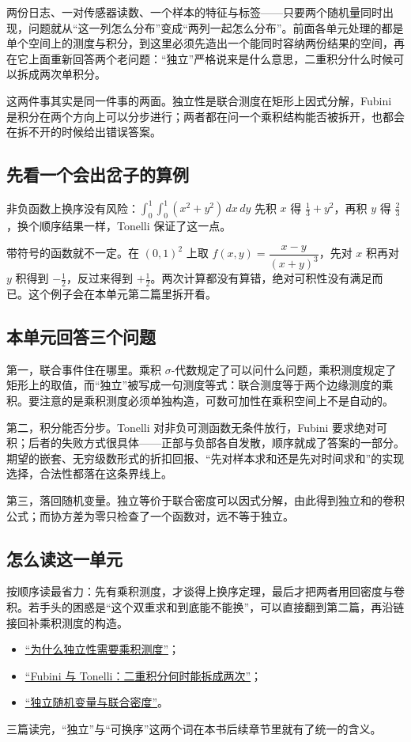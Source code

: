 两份日志、一对传感器读数、一个样本的特征与标签——只要两个随机量同时出现，问题就从``这一列怎么分布''变成``两列一起怎么分布''。前面各单元处理的都是单个空间上的测度与积分，到这里必须先造出一个能同时容纳两份结果的空间，再在它上面重新回答两个老问题：``独立''严格说来是什么意思，二重积分什么时候可以拆成两次单积分。

这两件事其实是同一件事的两面。独立性是联合测度在矩形上因式分解，Fubini 是积分在两个方向上可以分步进行；两者都在问一个乘积结构能否被拆开，也都会在拆不开的时候给出错误答案。

\subsection{先看一个会出岔子的算例}

非负函数上换序没有风险：\(\int_0^1\!\int_0^1 (x^2+y^2)\,dx\,dy\) 先积 \(x\) 得 \(\tfrac13+y^2\)，再积 \(y\) 得 \(\tfrac23\)，换个顺序结果一样，Tonelli 保证了这一点。

带符号的函数就不一定。在 \((0,1)^2\) 上取 \(f(x,y)=\dfrac{x-y}{(x+y)^3}\)，先对 \(x\) 积再对 \(y\) 积得到 \(-\tfrac12\)，反过来得到 \(+\tfrac12\)。两次计算都没有算错，绝对可积性没有满足而已。这个例子会在本单元第二篇里拆开看。

\subsection{本单元回答三个问题}

第一，联合事件住在哪里。乘积 \(\sigma\)-代数规定了可以问什么问题，乘积测度规定了矩形上的取值，而``独立''被写成一句测度等式：联合测度等于两个边缘测度的乘积。要注意的是乘积测度必须单独构造，可数可加性在乘积空间上不是自动的。

第二，积分能否分步。Tonelli 对非负可测函数无条件放行，Fubini 要求绝对可积；后者的失败方式很具体——正部与负部各自发散，顺序就成了答案的一部分。期望的嵌套、无穷级数形式的折扣回报、``先对样本求和还是先对时间求和''的实现选择，合法性都落在这条界线上。

第三，落回随机变量。独立等价于联合密度可以因式分解，由此得到独立和的卷积公式；而协方差为零只检查了一个函数对，远不等于独立。

\subsection{怎么读这一单元}

按顺序读最省力：先有乘积测度，才谈得上换序定理，最后才把两者用回密度与卷积。若手头的困惑是``这个双重求和到底能不能换''，可以直接翻到第二篇，再沿链接回补乘积测度的构造。

\begin{itemize}
\tightlist
\item \hyperref[sec:12-Real-Analysis-Support/06-Product-Measures-and-Fubini/01]{``为什么独立性需要乘积测度''}；
\item \hyperref[sec:12-Real-Analysis-Support/06-Product-Measures-and-Fubini/02]{``Fubini 与 Tonelli：二重积分何时能拆成两次''}；
\item \hyperref[sec:12-Real-Analysis-Support/06-Product-Measures-and-Fubini/03]{``独立随机变量与联合密度''}。
\end{itemize}

三篇读完，``独立''与``可换序''这两个词在本书后续章节里就有了统一的含义。
